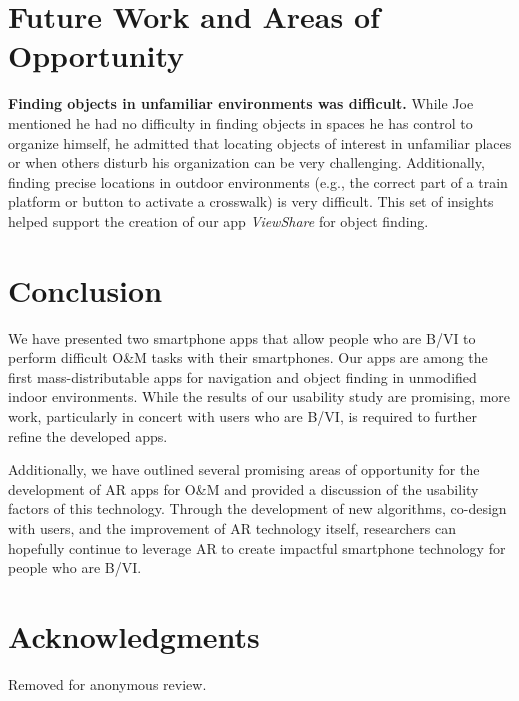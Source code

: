 \documentclass[chi_draft]{sigchi}
\newcommand{\BVI}{B/VI\xspace}
\newcommand{\OM}{O\&M\xspace}
\begin{document}
\section{Future Work and Areas of Opportunity}

\textbf{Finding objects in unfamiliar environments was difficult.} While Joe mentioned he had no difficulty in finding objects in spaces he has control to organize himself, he admitted that locating objects of interest in unfamiliar places or when others disturb his organization can be very challenging. Additionally, finding precise locations in outdoor environments (e.g., the correct part of a train platform or button to activate a crosswalk) is very difficult.  This set of insights helped support the creation of our app \emph{ViewShare} for object finding.

\section{Conclusion}
We have presented two smartphone apps that allow people who are \BVI to perform difficult \OM tasks with their smartphones.  Our apps are among the first mass-distributable apps for navigation and object finding in unmodified indoor environments.  While the results of our usability study are promising, more work, particularly in concert with users who are \BVI, is required to further refine the developed apps.

Additionally, we have outlined several promising areas of opportunity for the development of AR apps for \OM and provided a discussion of the usability factors of this technology.  Through the development of new algorithms, co-design with users, and the improvement of AR technology itself, researchers can hopefully continue to leverage AR to create impactful smartphone technology for people who are \BVI.  
%
\section{Acknowledgments}
Removed for anonymous review.

\balance{}



\end{document}
